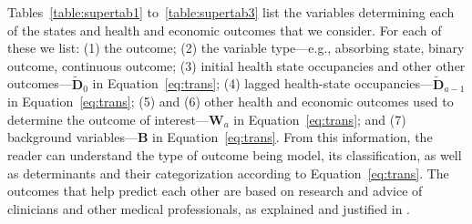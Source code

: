 Tables~\ref{table:supertab1} to~\ref{table:supertab3} list the variables determining each of the states and health and economic outcomes that we consider. For each of these we list: (1) the outcome; (2) the variable type---e.g., absorbing state, binary outcome, continuous outcome; (3) initial health state occupancies and other other outcomes---$\tilde{\bm{D}}_0$ in Equation~\eqref{eq:trans}; (4) lagged health-state occupancies---$\tilde{\bm{D}}_{a-1}$ in Equation~\eqref{eq:trans}; (5) and (6) other health and economic outcomes used to determine the outcome of interest---$\bm{W}_a$ in Equation~\eqref{eq:trans}; and (7) background variables---$\bm{B}$ in Equation~\eqref{eq:trans}. From this information, the reader can understand the type of outcome being model, its classification, as well as determinants and their categorization according to Equation~\eqref{eq:trans}. The outcomes that help predict each other are based on research and advice of clinicians and other medical professionals, as explained and justified in \citet{Goldman_etal_2015_Future-Elderly-Model-Report}.

